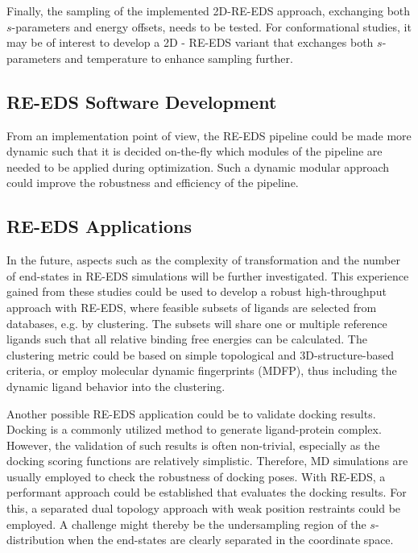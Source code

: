 Finally, the sampling of the implemented 2D-RE-EDS approach, exchanging both $s$-parameters and energy offsets, needs to be tested. For conformational studies, it may be of interest to develop a 2D - RE-EDS variant that exchanges both $s$-parameters and temperature to enhance sampling further.

\subsection{RE-EDS Software Development}
From an implementation point of view, the RE-EDS pipeline \cite{Ries2022} could be made more dynamic such that it is decided on-the-fly which modules of the pipeline are needed to be applied during optimization. Such a dynamic modular approach could improve the robustness and efficiency of the pipeline.


\subsection{RE-EDS Applications}
In the future, aspects such as the complexity of transformation and the number of end-states in RE-EDS simulations will be further investigated. 
This experience gained from these studies could be used to develop a robust high-throughput approach with RE-EDS, where feasible subsets of ligands are selected from databases, e.g. by clustering. The subsets will share one or multiple reference ligands such that all relative binding free energies can be calculated. The clustering metric could be based on simple topological and 3D-structure-based criteria, or employ molecular dynamic fingerprints (MDFP),\cite{Riniker2017} thus including the dynamic ligand behavior into the clustering.


Another possible RE-EDS application could be to validate docking results. Docking is a commonly utilized method to generate ligand-protein complex. \cite{Zhao2015, Eberhardt2021, Morris2009} However, the validation of such results is often non-trivial, especially as the docking scoring functions are relatively simplistic.\cite{Chen2015} Therefore, MD simulations are usually employed to check the robustness of docking poses.\cite{Zhao2015, Feng2015, Sokkar2011, Chavda2019} With RE-EDS, a performant approach could be established that evaluates the docking results. For this, a separated dual topology approach \cite{Rocklin2013} with weak position restraints could be employed. A challenge might thereby be the undersampling region of the $s$-distribution when the end-states are clearly separated in the coordinate space. 


